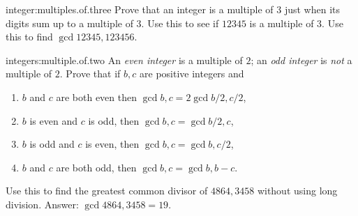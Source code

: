 \begin{problem}{integer:multiples.of.three}
Prove that an integer is a multiple of 3 just when its digits sum up to a multiple of 3.
Use this to see if \(12345\) is a multiple of \(3\).
Use this to find \(\gcd{12345,123456}\).
\end{problem}

\begin{problem}{integers:multiple.of.two}
An \emph{even integer} is a multiple of \(2\); an \emph{odd integer} is \emph{not} a multiple of \(2\).
Prove that if \(b,c\) are positive integers and 
\begin{enumerate}
\item
\(b\) and \(c\) are both even then \(\gcd{b,c}=2\gcd{b/2,c/2}\),
\item
\(b\) is even and \(c\) is odd, then \(\gcd{b,c}=\gcd{b/2,c}\),
\item
\(b\) is odd and \(c\) is even, then \(\gcd{b,c}=\gcd{b,c/2}\),
\item
\(b\) and \(c\) are both odd, then \(\gcd{b,c}=\gcd{b,b-c}\).
\end{enumerate}
Use this to find the greatest common divisor of \(4864, 3458\) without using long division. Answer: \(\gcd{4864,3458}=19\).
\end{problem}
%    
